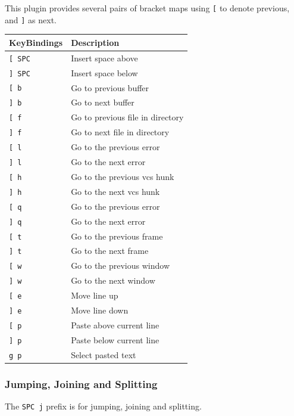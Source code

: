 \documentclass[11pt]{article}
\begin{document}
This plugin provides several pairs of bracket maps using \texttt{[} to denote
previous, and \texttt{]} as next.

\begin{center}
\begin{tabular}{ll}
KeyBindings & Description\\
\hline
\texttt{[ SPC} & Insert space above\\
\texttt{] SPC} & Insert space below\\
\texttt{[ b} & Go to previous buffer\\
\texttt{] b} & Go to next buffer\\
\texttt{[ f} & Go to previous file in directory\\
\texttt{] f} & Go to next file in directory\\
\texttt{[ l} & Go to the previous error\\
\texttt{] l} & Go to the next error\\
\texttt{[ h} & Go to the previous vcs hunk\\
\texttt{] h} & Go to the next vcs hunk\\
\texttt{[ q} & Go to the previous error\\
\texttt{] q} & Go to the next error\\
\texttt{[ t} & Go to the previous frame\\
\texttt{] t} & Go to the next frame\\
\texttt{[ w} & Go to the previous window\\
\texttt{] w} & Go to the next window\\
\texttt{[ e} & Move line up\\
\texttt{] e} & Move line down\\
\texttt{[ p} & Paste above current line\\
\texttt{] p} & Paste below current line\\
\texttt{g p} & Select pasted text\\
\end{tabular}
\end{center}

\subsubsection{Jumping, Joining and Splitting}
\label{sec:org74876cc}
The \texttt{SPC j} prefix is for jumping, joining and splitting.
\end{document}
